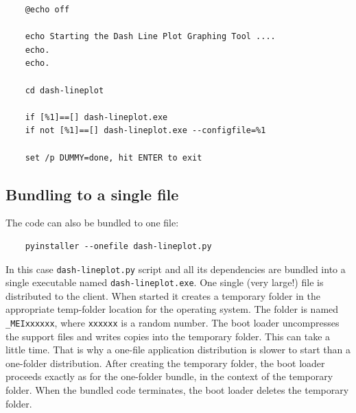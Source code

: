 \footnotesize
\begin{lstlisting}
    @echo off

    echo Starting the Dash Line Plot Graphing Tool ....
    echo.
    echo.

    cd dash-lineplot

    if [%1]==[] dash-lineplot.exe
    if not [%1]==[] dash-lineplot.exe --configfile=%1

    set /p DUMMY=done, hit ENTER to exit
\end{lstlisting}
\normalsize

\subsection{Bundling to a single file}

The code can also be bundled to one file:

\footnotesize
\begin{lstlisting}
    pyinstaller --onefile dash-lineplot.py
\end{lstlisting}
\normalsize

In this case \texttt{dash-lineplot.py} script and all its dependencies are bundled into a single executable
named \texttt{dash-lineplot.exe}. One single (very large!) file is distributed to the client.  When started it creates a temporary folder in the appropriate temp-folder location for the operating system. The folder is named \texttt{\_MEIxxxxxx}, where \texttt{xxxxxx} is a random number. The boot loader uncompresses the support files and writes copies into the temporary folder. This can take a little time. That is why a one-file application distribution is slower to start than a one-folder distribution. After creating the temporary folder, the boot loader proceeds exactly
as for the one-folder bundle, in the context of the temporary folder. When the bundled code terminates,
the boot loader deletes the temporary folder.


